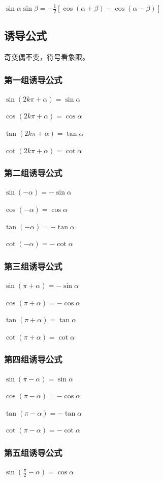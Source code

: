 \documentclass[UTF8]{ctexbook}
\begin{document}
{{{  $\sin{\alpha}\sin{\beta} = -\frac{1}{2}[\cos{(\alpha + \beta)} - \cos{(\alpha - \beta)}]$
}

\subsection{诱导公式}{
  \indent 奇变偶不变，符号看象限。
  \subsubsection{第一组诱导公式}{
    $\sin{(2k\pi + \alpha)} = \sin{\alpha}$

    $\cos{(2k\pi + \alpha)} = \cos{\alpha}$

    $\tan(2k\pi + \alpha) = \tan\alpha$

    $\cot(2k\pi + \alpha) = \cot\alpha$
  }

  \subsubsection{第二组诱导公式}{
    $\sin(-\alpha) = -\sin\alpha$

    $\cos(-\alpha) = \cos\alpha$

    $\tan(-\alpha) = -\tan\alpha$

    $\cot(-\alpha) = -\cot\alpha$
  }

  \subsubsection{第三组诱导公式}{
    $\sin(\pi + \alpha) = -\sin\alpha$

    $\cos(\pi + \alpha) = -\cos\alpha$

    $\tan(\pi + \alpha) = \tan\alpha$

    $\cot(\pi + \alpha) = \cot\alpha$
  }

  \subsubsection{第四组诱导公式}{
    $\sin(\pi - \alpha) = \sin\alpha$

    $\cos(\pi - \alpha) = -\cos\alpha$

    $\tan(\pi - \alpha) = -\tan\alpha$

    $\cot(\pi - \alpha) = -\cot\alpha$
  }

  \subsubsection{第五组诱导公式}{
    $\sin(\frac{\pi}{2} - \alpha) = \cos\alpha$

}}}}
\end{document}

